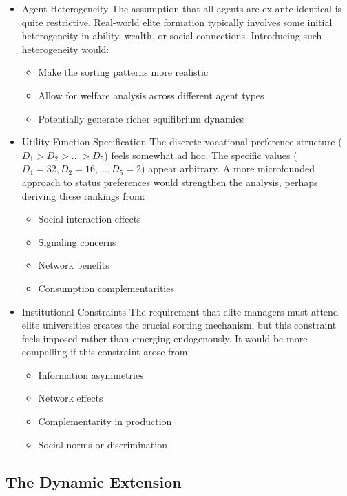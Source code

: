 \documentclass[12pt,letterpaper]{article}
\begin{document}
\begin{itemize}
	\item Agent Heterogeneity
	The assumption that all agents are ex-ante identical is quite restrictive. Real-world elite formation typically involves some initial heterogeneity in ability, wealth, or social connections. Introducing such heterogeneity would:
		\begin{itemize}
			\item Make the sorting patterns more realistic
			\item Allow for welfare analysis across different agent types
			\item Potentially generate richer equilibrium dynamics
		\end{itemize}

	\item Utility Function Specification
	The discrete vocational preference structure ($D_1 > D_2 > \ldots > D_5$) feels somewhat ad hoc. The specific values ($D_1 = 32, D_2 = 16, \ldots, D_5 = 2$) appear arbitrary. A more microfounded approach to status preferences would strengthen the analysis, perhaps deriving these rankings from:
		\begin{itemize}
			\item Social interaction effects
			\item Signaling concerns
			\item Network benefits
			\item Consumption complementarities
		\end{itemize}

	\item Institutional Constraints
	The requirement that elite managers must attend elite universities creates the crucial sorting mechanism, but this constraint feels imposed rather than emerging endogenously. It would be more compelling if this constraint arose from:
		\begin{itemize}
			\item Information asymmetries
			\item Network effects
			\item Complementarity in production
			\item Social norms or discrimination
		\end{itemize}
\end{itemize}

\subsection{The Dynamic Extension}
\end{document}
